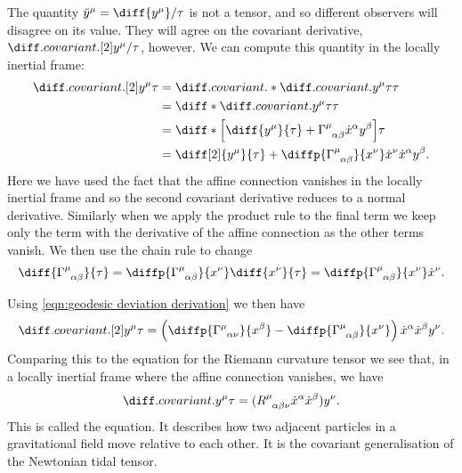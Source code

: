 \documentclass[fleqn]{NotesClass}
\newcommand*{\christoffel}[3]{\tensor{\Gamma}{^{#1}_{{#2}{#3}}}}
\begin{document}
    The quantity \(\ddot{y}^\mu = \diff{y^\mu}/{\tau}\) is not a tensor, and so different observers will disagree on its value.
    They will agree on the covariant derivative, \(\diffcov[2]{y^\mu}/{\tau}\), however.
    We can compute this quantity in the locally inertial frame:
    \begin{align}
        \diffcov[2]{y^\mu}{\tau} &= \diffcov*{\diffcov{y^\mu}{\tau}}{\tau}\\
        &= \diff*{\diffcov{y^\mu}{\tau}}{\tau}\\
        &= \diff*{\left[ \diff{y^\mu}{\tau} + \christoffel{\mu}{\alpha}{\beta} \dot{x}^\alpha y^\beta \right]}{\tau}\\
        &= \diff[2]{y^\mu}{\tau} + \diffp{\christoffel{\mu}{\alpha}{\beta}}{x^\nu} \dot{x}^\nu \dot{x}^\alpha y^\beta.
    \end{align}
    Here we have used the fact that the affine connection vanishes in the locally inertial frame and so the second covariant derivative reduces to a normal derivative.
    Similarly when we apply the product rule to the final term we keep only the term with the derivative of the affine connection as the other terms vanish.
    We then use the chain rule to change
    \begin{equation}
        \diff{\christoffel{\mu}{\alpha}{\beta}}{\tau} = \diffp{\christoffel{\mu}{\alpha}{\beta}}{x^\nu}\diff{x^\nu}{\tau} = \diffp{\christoffel{\mu}{\alpha}{\beta}}{x^\nu}\dot{x}^\nu.
    \end{equation}
    
    Using \cref{eqn:geodesic deviation derivation} we then have
    \begin{equation}
        \diffcov[2]{y^\mu}{\tau} = \left( \diffp{\christoffel{\mu}{\alpha}{\nu}}{x^\beta} - \diffp{\christoffel{\mu}{\alpha}{\beta}}{x^\nu} \right)\dot{x}^\alpha\dot{x}^\beta y^\nu.
    \end{equation}
    Comparing this to the equation for the Riemann curvature tensor we see that, in a locally inertial frame where the affine connection vanishes, we have
    \begin{equation}
        \diffcov{y^\mu}{\tau} = (\tensor{R}{^\mu_{\alpha\beta\nu}}\dot{x}^\alpha\dot{x}^\beta) y^\nu.
    \end{equation}
    This is called the  equation.
    It describes how two adjacent particles in a gravitational field move relative to each other.
    It is the covariant generalisation of the Newtonian tidal tensor.
    
\end{document}
